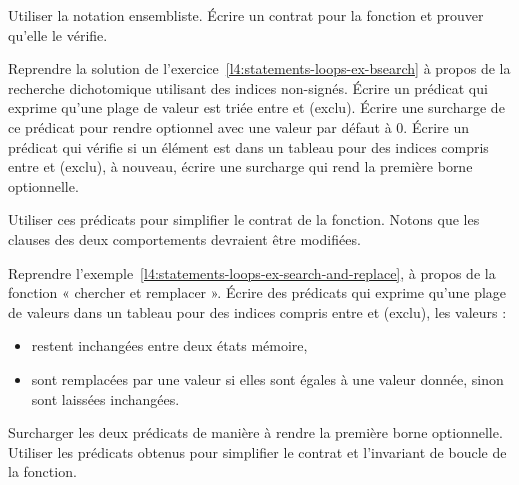 Utiliser la notation ensembliste. Écrire un contrat pour la fonction et prouver
qu'elle le vérifie.



\label{l4:acsl-properties-predicates-ex-bsearch}


Reprendre la solution de l'exercice~\ref{l4:statements-loops-ex-bsearch} à propos
de la recherche dichotomique utilisant des indices non-signés. Écrire un prédicat
qui exprime qu'une plage de valeur est triée entre  et
 (exclu). Écrire une surcharge de ce prédicat pour rendre
 optionnel avec une valeur par défaut à $0$. Écrire un prédicat
qui vérifie si un élément est dans un tableau pour des indices compris entre
 et  (exclu), à nouveau, écrire une surcharge
qui rend la première borne optionnelle.


Utiliser ces prédicats pour simplifier le contrat de la fonction. Notons que les
clauses  des deux comportements devraient être modifiées.





Reprendre l'exemple~\ref{l4:statements-loops-ex-search-and-replace}, à propos de
la fonction « chercher et remplacer ». Écrire des prédicats qui exprime qu'une plage
de valeurs dans un tableau pour des indices compris entre  et
 (exclu), les valeurs :

\begin{itemize}
  \item restent inchangées entre deux états mémoire,
  \item sont remplacées par une valeur si elles sont égales à une valeur donnée,
        sinon sont laissées inchangées.
\end{itemize}


Surcharger les deux prédicats de manière à rendre la première borne optionnelle.
Utiliser les prédicats obtenus pour simplifier le contrat et l'invariant de
boucle de la fonction.
